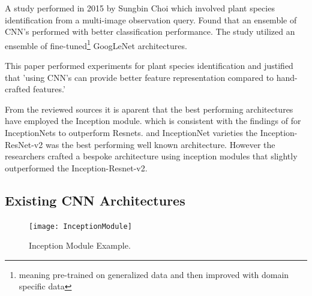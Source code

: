     \par
    A study performed in 2015 by Sungbin Choi \cite{Choi} which involved plant species identification from a multi-image observation query. Found that an ensemble of CNN's performed with better classification performance. The study utilized an ensemble of fine-tuned\footnote[2]{meaning pre-trained on generalized data and then improved with domain specific data} GoogLeNet architectures.
    \par
    This paper \cite{Zhu2018} performed experiments for plant species identification and justified that 'using CNN's can provide better feature representation compared to hand-crafted features.' %
    \par
    From the reviewed sources it is aparent that the best performing architectures have employed the Inception \cite{Szegedy2015} module. which is consistent with the findings of \cite{Wu2019} for InceptionNets to outperform Resnets.  %
   \cite{He} and InceptionNet varieties the Inception-ResNet-v2 was the best performing well known architecture. However the researchers crafted a bespoke architecture using inception modules that slightly outperformed the Inception-Resnet-v2. %
  \subsection{Existing CNN Architectures}
  \par
  \begin{figure}
    \centering
    \texttt{[image: InceptionModule]}
    \caption{\label{fig:InceptionModule}Inception Module Example.}
  \end{figure}
